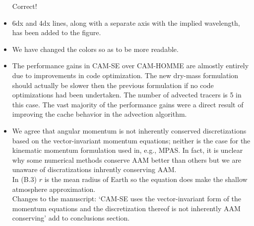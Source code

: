 \documentclass[11pt]{article}
\begin{document}
\begin{itemize}
Correct!

\item {\color{blue}{Figure 6: It is difficult to get a sense of the physical scales in the kinetic energy spectrum plot. Could either a second axis showing physical wavelengths, or a line indicating 6dx or 4dx scales, be added to the plot?}}

6dx and 4dx lines, along with a separate axis with the implied wavelength, has been added to the figure.

\item {\color{blue}{Figure 7: Some of the colours, especially blue and purple, and red and magenta, are hard to tell apart. }}

We have changed the colors so as to be more readable.

\item {\color{blue}{Section 4.3: The performance gains in CAM-SE over CAM-HOMME are excellent. Is this due to code optimization, or have there been science-related changes that could also lead to speedups? Also, tracer advection can be a major cost in many numerical models. How many tracers are used for these benchmark tests, and how efficient is the tracer advection compared to the rest of the dynamics?}}

The performance gains in CAM-SE over CAM-HOMME are almostly entirely due to improvements in code optimization. The new dry-mass formulation should actually be slower then the previous formulation if no code optimizations had been undertaken.  The number of advected tracers is 5 in this case.  The vast majority of the performance gains were a direct result of improving the cache behavior in the advection algorithm.  
   

\item {\color{blue}{Appendix B: we see that the continuous equations are indeed mass, angular momentum, and energy conserving. How might the discretization affect these conservation relations? In particular, I had thought that the vector-invariant momentum equation (49) is not angular-momentum conserving; and the angular momentum conservation law (B.3) does not make the shallow-atmosphere approxmiation used in the rest of the text.}}

We agree that angular momentum is not inherently conserved discretizations based on the vector-invariant momentum equations; neither is the case for the kinematic momentum formulation used in, e.g., MPAS. In fact, it is unclear why some numerical methods conserve AAM better than others \citep[see ][]{LBDL2014JAMES} but we are unaware of discratizations inhrently conserving AAM.\\

In (B.3) $r$ is the mean radius of Earth so the equation does make the shallow atmosphere approximation.\\

Changes to the manuscript: `CAM-SE uses the vector-invariant form of the momentum equations and the discretization thereof is not inherently AAM conserving' add to conclusions section.
\end{itemize}  
\newpage
\end{document}
